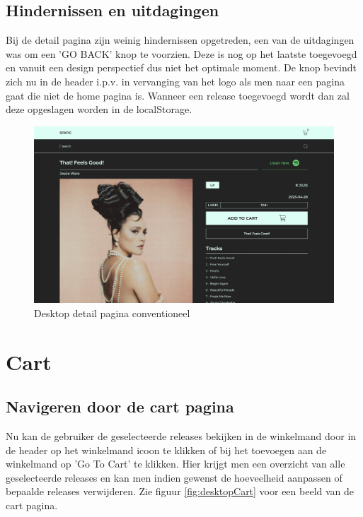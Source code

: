 \subsection{Hindernissen en uitdagingen}

Bij de detail pagina zijn weinig hindernissen opgetreden, een van de uitdagingen was om een 'GO BACK' knop te voorzien. Deze is nog op het laatste toegevoegd en vanuit een design perspectief dus niet het optimale moment. De knop bevindt zich nu in de header i.p.v. in vervanging van het logo als men naar een pagina gaat die niet de home pagina is. Wanneer een release toegevoegd wordt dan zal deze opgeslagen worden in de localStorage.

\begin{figure}
	\centering
	\includegraphics[width=1\linewidth]{graphics/desktopDetailConventioneel}
	\caption[Desktop detail pagina conventioneel]{Desktop detail pagina conventioneel}
	\label{fig:desktopDetailConventioneel}
\end{figure}

\section{Cart}

\subsection{Navigeren door de cart pagina}

Nu kan de gebruiker de geselecteerde releases bekijken in de winkelmand door in de header op het winkelmand icoon te klikken of bij het toevoegen aan de winkelmand op 'Go To Cart' te klikken. Hier krijgt men een overzicht van alle geselecteerde releases en kan men indien gewenst de hoeveelheid aanpassen of bepaalde releases verwijderen. Zie figuur \ref{fig:desktopCart} voor een beeld van de cart pagina.

